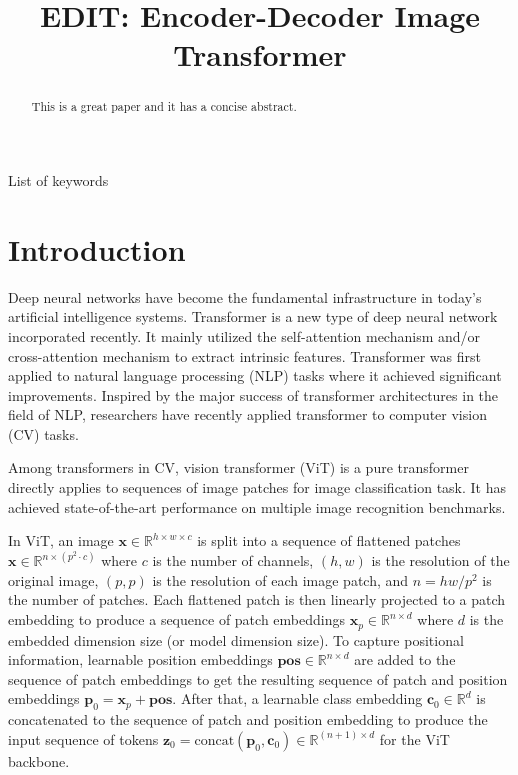 \documentclass[anon,12pt]{colt2024} %
\title[Short Title]{EDIT: Encoder-Decoder Image Transformer}
\begin{document}
\maketitle

\begin{abstract}%
  This is a great paper and it has a concise abstract.%
\end{abstract}

\begin{keywords}%
  List of keywords%
\end{keywords}

\section{Introduction}

Deep neural networks have become the fundamental infrastructure in today's artificial intelligence systems. 
Transformer is a new type of deep neural network incorporated recently.
It mainly utilized the self-attention mechanism and/or cross-attention mechanism to extract intrinsic features.
Transformer was first applied to natural language processing (NLP) tasks where it achieved significant improvements.
Inspired by the major success of transformer architectures in the field of NLP, researchers have recently applied transformer to computer vision (CV) tasks.

Among transformers in CV, vision transformer (ViT) is a pure transformer directly applies to sequences of image patches for image classification task.
It has achieved state-of-the-art performance on multiple image recognition benchmarks.

In ViT, an image $\mathbf{x} \in \mathbb{R} ^ {h \times w \times c}$ is split into a sequence of flattened patches $\mathbf{x} \in \mathbb{R} ^ {n \times (p^2 \cdot c)}$ where $c$ is the number of channels, $(h,w)$ is the resolution of the original image, $(p,p)$ is the resolution of each image patch, and $n=hw/p^2$ is the number of patches.
Each flattened patch is then linearly projected to a patch embedding to produce a sequence of patch embeddings $\mathbf{x}_p \in \mathbb{R} ^ {n \times d}$ where $d$ is the embedded dimension size (or model dimension size).
To capture positional information, learnable position embeddings $\mathbf{pos} \in \mathbb{R} ^ {n \times d}$ are added to the sequence of patch embeddings to get the resulting sequence of patch and position embeddings $\mathbf{p}_0 = \mathbf{x}_p + \mathbf{pos}$.
After that, a learnable class embedding $\mathbf{c}_0 \in \mathbb{R}^d$ is concatenated to the sequence of patch and position embedding to produce the input sequence of tokens $\mathbf{z}_0 = \mathrm{concat}(\mathbf{p}_0,  \mathbf{c}_0) \in \mathbb{R} ^ {(n+1) \times d}$ for the ViT backbone.
\end{document}
